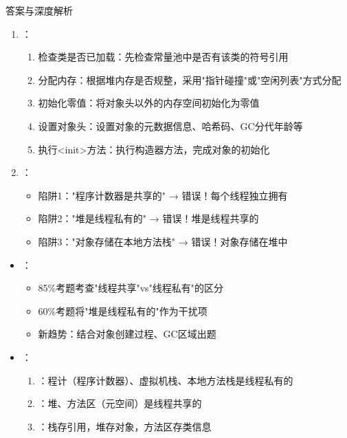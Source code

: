 \documentclass[12pt, a4paper]{ctexart}
\begin{document}
\begin{enumerate}[label=\textbf{\arabic*.}]
\begin{bluebox}{答案与深度解析}
\begin{enumerate}[leftmargin=*, nosep]
			      \item {}：
			            \begin{enumerate}
				            \item 检查类是否已加载：先检查常量池中是否有该类的符号引用
				            \item 分配内存：根据堆内存是否规整，采用"指针碰撞"或"空闲列表"方式分配
				            \item 初始化零值：将对象头以外的内存空间初始化为零值
				            \item 设置对象头：设置对象的元数据信息、哈希码、GC分代年龄等
				            \item 执行<init>方法：执行构造器方法，完成对象的初始化
			            \end{enumerate}

			      \item {}：
			            \begin{itemize}
				            \item 陷阱1："程序计数器是共享的" → 错误！每个线程独立拥有
				            \item 陷阱2："堆是线程私有的" → 错误！堆是线程共享的
				            \item 陷阱3："对象存储在本地方法栈" → 错误！对象存储在堆中
			            \end{itemize}
		      \end{enumerate}

		      \begin{itemize}[leftmargin=*, nosep]
			      \item {}：
			            \begin{itemize}
				            \item 85\%考题考查"线程共享"vs"线程私有"的区分
				            \item 60\%考题将"堆是线程私有的"作为干扰项
				            \item 新趋势：结合对象创建过程、GC区域出题
			            \end{itemize}

			      \item {}：
			            \begin{enumerate}
				            \item {}：程计（程序计数器）、虚拟机栈、本地方法栈是线程私有的
				            \item {}：堆、方法区（元空间）是线程共享的
				            \item {}：栈存引用，堆存对象，方法区存类信息
			            \end{enumerate}


\end{itemize}
\end{bluebox}
\end{enumerate}
\end{document}
